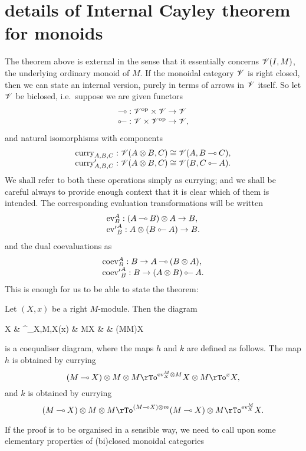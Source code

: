 \documentclass{robinthesisdraft}
\newenvironment{snippet}[1]{\section{#1}}{}
\begin{document}
\begin{snippet}{details of Internal Cayley theorem for monoids}
The theorem above is external in the sense that it essentially
concerns $\mathscr{V}(I, M)$, the underlying ordinary monoid of $M$. If
the monoidal category $\mathscr{V}$ is right closed, then we can state
an internal version, purely in terms of arrows in $\mathscr{V}$ itself.
%
So let $\mathscr{V}$ be biclosed, i.e.\ suppose we are given
functors
\[\begin{array}{l}
	\lolli: \V\op\times\V\to\V \\
	\illol: \V\times\V\op\to\V,
\end{array}\]
and natural isomorphisms with components
\[\begin{array}{l}
	\curry_{A,B,C}:  \V(A\tn B, C) \cong \V(A, B\lolli C), \\
	\curry'_{A,B,C}: \V(A\tn B, C) \cong \V(B, C\illol A).
\end{array}\]
We shall refer to both these operations simply as currying;
and we shall be careful always to provide enough context that
it is clear which  of them is intended.
The corresponding evaluation transformations will be written
\[\begin{array}{l}
	\ev^{A}_{B}: (A\lolli B)\tn A \to B, \\
	{\ev'}^{A}_{B}: A\tn(B\illol A) \to B.
\end{array}\]
and the dual coevaluations as
\[\begin{array}{l}
	\coev^{A}_{B}: B \to A\lolli(B\tn A), \\
	{\coev'}^{A}_{B}: B \to (A\tn B)\illol A.
\end{array}\]
This is enough for us to be able to state the theorem:
\begin{thm}\label{thm-1d-internal}
	Let $(X,x)$ be a right $M$-module. Then the diagram
	\begin{diagram}
		X & \rTo^{\curry_{X,M,X}(x)} & M\lolli X & 
		 & (M\tn M)\lolli X
	\end{diagram}
	is a coequaliser diagram, where the maps $h$ and $k$ are defined as
	follows. The map $h$ is obtained by currying
	\[
		(M\lolli X)\tn M\tn M \rTo^{\ev^{M}_{X}\tn M} X\tn M \rTo^{x} X,
	\]
	and $k$ is obtained by currying
	\[
		(M\lolli X)\tn M\tn M \rTo^{(M\lolli X)\tn m} (M\lolli X)\tn M \rTo^{\ev^{M}_{X}} X.
	\]
\end{thm}
%
If the proof is to be organised in a sensible way, we need to call
upon some elementary properties of (bi)closed monoidal categories

\end{snippet}
\end{document}
